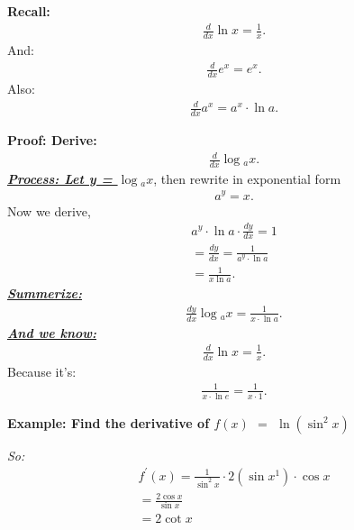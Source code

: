 \documentclass{report}
\begin{document}
  \bigbreak \noindent \bigbreak \noindent \bigbreak \noindent 
  \begin{mdframed}
    \textbf{Recall:}
    \begin{align*}
      \frac{d}{dx} \ln{x} = \frac{1}{x}
    .\end{align*}
    And:
    \begin{align*}
      \frac{d}{dx}e^{x}=e^{x}
    .\end{align*}
    Also:
    \begin{align*}
      \frac{d}{dx}a^{x} = a^{x}\cdot \ln{a}
    .\end{align*}
  \end{mdframed}
  \begin{mdframed}
    \textbf{Proof: Derive:}
    \begin{align*}
      \frac{d}{dx}\log{_ax}
    .\end{align*}
    \textbf{\textit{\underline{Process: Let y = $\log{_ax}$}}}, then rewrite in exponential form
    \begin{align*}
      a^{y} = x
    .\end{align*}
    Now we derive,
    \begin{align*}
      a^{y} \cdot \ln{a} \cdot \frac{dy}{dx} = 1 \\
      = \frac{dy}{dx} = \frac{1}{a^{y}\cdot \ln{a}}  \\
      = \frac{1}{x\ln{a}}
    .\end{align*}
    \textbf{\textit{\underline{Summerize:}}}
    \begin{align*}
      \frac{dy}{dx}\log{_ax} = \frac{1}{x\cdot \ln{a}}
    .\end{align*}
    \textbf{\textit{\underline{And we know:}}}
    \begin{align*}
      \frac{d}{dx} \ln{x} = \frac{1}{x}
    .\end{align*}
    Because it's:
    \begin{align*}
      \frac{1}{x\cdot \ln{e}} = \frac{1}{x\cdot 1} 
    .\end{align*}
  \end{mdframed}
  
  \pagebreak \bigbreak \noindent
  \begin{mdframed}
    \textbf{Example: Find the derivative of $f(x)$ $=$ $\ln{(\sin^{2}{x})}$ }
  \end{mdframed}
  \bigbreak \noindent
  \textit{So:}
  \begin{align*}
   f^{\prime}(x) = \frac{1}{\sin^{2}{x}} \cdot 2(\sin{x}^{1}) \cdot \cos{x} \\
   = \frac{2\cos{x}}{\sin{x}} \\
   = 2\cot{x}
  \end{align*}
\end{document}
